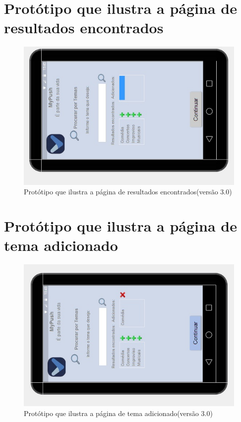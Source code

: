 \begin{apendicesenv}
      \section*{Protótipo que ilustra a página de resultados encontrados}

    \begin{figure}[!htbp]
      \centering
      \includegraphics[scale=0.5, angle=-90]{editaveis/figuras/prototipo_alta_fidelidade_v3/3_3}
      \caption{Protótipo que ilustra a página de resultados encontrados(versão 3.0)}
      \label{v3}
    \end{figure}
    
      \section*{Protótipo que ilustra a página de tema adicionado}

    \begin{figure}[!htbp]
      \centering
      \includegraphics[scale=0.5, angle=-90]{editaveis/figuras/prototipo_alta_fidelidade_v3/3_4}
      \caption{Protótipo que ilustra a página de tema adicionado(versão 3.0)}
      \label{v3}
    \end{figure}
    

\end{apendicesenv}
